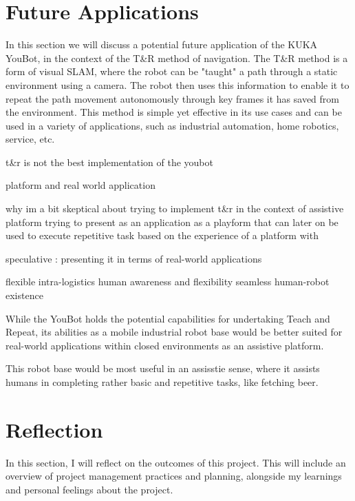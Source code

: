 \documentclass[a4paper, 12pt]{article}
\newif\ifshownotes
\newcommand{\notes}[1]{\ifshownotes\textcolor{blue}{#1}\fi}
\begin{document}
    \notes{discuss installing the drivers and whatnot, and how to use it within ROS and rqt.}

    \pagebreak

    \section{Future Applications}

    In this section we will discuss a potential future application of the KUKA YouBot, in the context of the T\&R method of navigation. The T\&R method is a form of visual SLAM, where the robot can be "taught" a path through a static environment using a camera. The robot then uses this information to enable it to repeat the path movement autonomously through key frames it has saved from the environment. This method is simple yet effective in its use cases and can be used in a variety of applications, such as industrial automation, home robotics, service, etc.

    t\&r is not the best implementation of the youbot
    
    platform and real world application

    why im a bit skeptical about 
    trying to implement t\&r in the context of assistive platform 
    trying to present as an application as a playform that can later on be used to execute repetitive task based on the experience of a platform with 

    speculative : presenting it in terms of real-world applications

    flexible intra-logistics
    human awareness and flexibility 
    seamless human-robot existence

    While the YouBot holds the potential capabilities for undertaking Teach and Repeat, its abilities as a mobile industrial robot base would be better suited for real-world applications within closed environments as an assistive platform. 

    This robot base would be most useful in an assisstie  sense, where it assists humans in completing rather basic and repetitive tasks, like fetching beer. 

    \pagebreak

    \section{Reflection}

    \notes{draft 1, 11.05 6pm}

    In this section, I will reflect on the outcomes of this project. This will include an overview of project management practices and planning, alongside my learnings and personal feelings about the project. 
\end{document}
